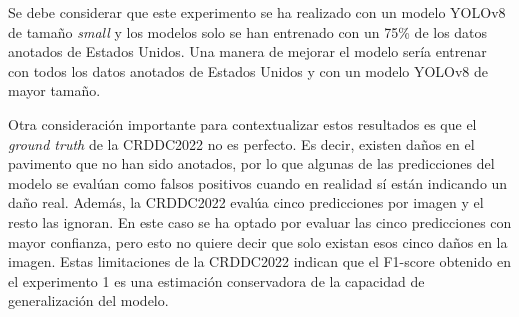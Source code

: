 \begin{table}[H]
    \centering
    \caption{F1-scores para los 10 primeros equipos en la plataforma de la CRDDC2022 para los datos de test de Estados Unidos en el momento del cierre de la competición. \cite{Leaderboard_CRDDC2022}}
    \label{tab:top10_f1_scores}
\end{table}

Se debe considerar que este experimento se ha realizado con un modelo YOLOv8 de tamaño \textit{small} y los modelos solo se han entrenado con un 75\% de los datos anotados de Estados Unidos. Una manera de mejorar el modelo sería entrenar con todos los datos anotados de Estados Unidos y con un modelo YOLOv8 de mayor tamaño.

Otra consideración importante para contextualizar estos resultados es que el \textit{ground truth} de la CRDDC2022 no es perfecto. Es decir, existen daños en el pavimento que no han sido anotados, por lo que algunas de las predicciones del modelo se evalúan como falsos positivos cuando en realidad sí están indicando un daño real. Además, la CRDDC2022 evalúa cinco predicciones por imagen y el resto las ignoran. En este caso se ha optado por evaluar las cinco predicciones con mayor confianza, pero esto no quiere decir que solo existan esos cinco daños en la imagen. Estas limitaciones de la CRDDC2022 indican que el F1-score obtenido en el experimento 1 es una estimación conservadora de la capacidad de generalización del modelo.

